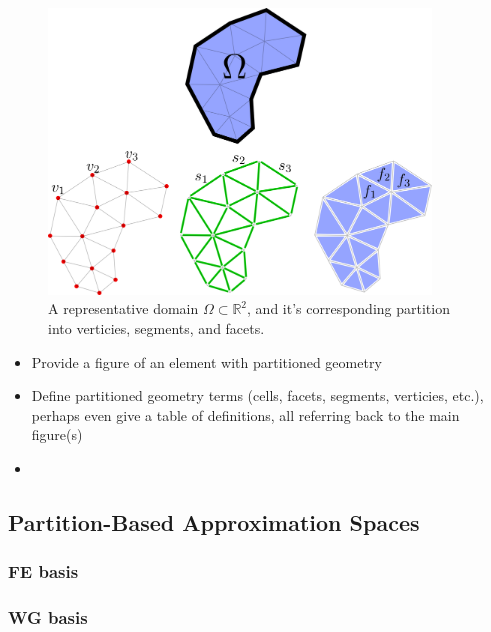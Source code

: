 \begin{figure} [!ht]
	\centering
	\includegraphics[width = 4.0in]{figures/partition.png}
	\caption{A representative domain $\Omega \subset \mathbb{R}^2$, and it's corresponding partition into verticies, segments, and facets.}
	\label{fig:partitioned_element}
\end{figure}

\begin{itemize}
	\item Provide a figure of an element with partitioned geometry
	\item Define partitioned geometry terms (cells, facets, segments, verticies, etc.), perhaps even give a table of definitions, all referring back to the main figure(s)
	\item 
\end{itemize}

\subsection{Partition-Based Approximation Spaces}

		\subsubsection*{FE basis}
		\subsubsection*{WG basis}
